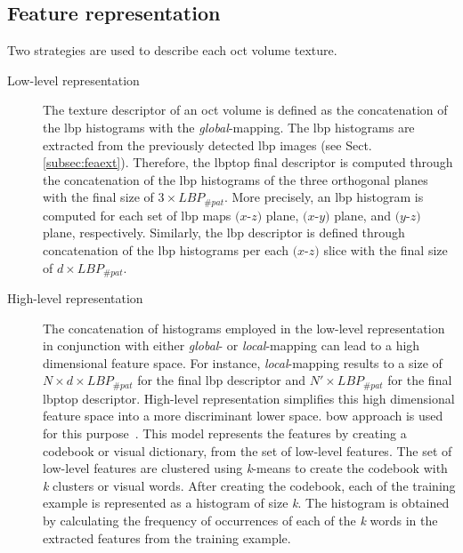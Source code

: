 \subsection{Feature representation}\label{subsec:fearep}

Two strategies are used to describe each \ac{oct} volume texture.

\begin{description}

\item[Low-level representation] The texture descriptor of an \ac{oct} volume is defined as the concatenation of the \ac{lbp} histograms with the \emph{global}-mapping.
The \ac{lbp} histograms are extracted from the previously detected \ac{lbp} images (see Sect.\,\ref{subsec:feaext}).
Therefore, the \ac{lbptop} final descriptor is computed through the concatenation of the \ac{lbp} histograms of the three orthogonal planes with the final size of $3 \times LBP_{\#pat}$.
More precisely, an \ac{lbp} histogram is computed for each set of \ac{lbp} maps $(x$-$z)$ plane, $(x$-$y)$ plane, and $(y$-$z)$ plane, respectively.
Similarly, the \ac{lbp} descriptor is defined through concatenation of the \ac{lbp} histograms per each $(x$-$z)$ slice with the final size of $d \times LBP_{\#pat}$.

\item[High-level representation] The concatenation of histograms employed in the low-level representation in conjunction with either \emph{global}- or \emph{local}-mapping can lead to a high dimensional feature space.
For instance, \emph{local}-mapping results to a size of $N \times d \times LBP_{\#pat}$ for the final \ac{lbp} descriptor and $N' \times LBP_{\#pat}$ for the final \ac{lbptop} descriptor.
High-level representation simplifies this high dimensional feature space into a more discriminant lower space.
\ac{bow} approach is used for this purpose~\cite{Sivic2003}.
This model represents the features by creating a codebook or visual dictionary, from the set of low-level features.
The set of low-level features are clustered using \textit{k}-means to create the codebook with \textit{k} clusters or visual words.
After creating the codebook, each of the training example is represented as a histogram of size \textit{k}.
The histogram is obtained by calculating the frequency of occurrences of each of the \textit{k} words in the extracted features from the training example.

\end{description}

